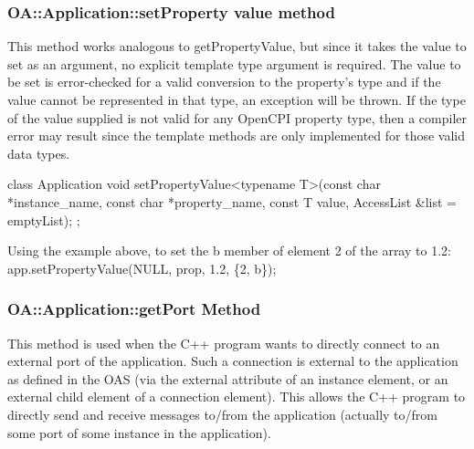 \documentclass[10pt, a4paper, oneside]{article}
\renewcommand\_{\textunderscore\allowbreak} %
\begin{document}
\subsubsection{OA::Application::setProperty value method}
This method works analogous to getPropertyValue, but since it takes the value to set as an argument, no explicit template type argument is required. The value to be set is error-checked for a valid conversion to the property's type and if the value cannot be represented in that type, an exception will be thrown. If the type of the value supplied is not valid for any OpenCPI property type, then a compiler error may result since the template methods are only implemented for those valid data types.
\begin{ocpixml}
class Application {
void setPropertyValue<typename T>(const char *instance_name,
                                      const char *property_name,
                                      const T value,
                                      AccessList &list = emptyList);
};\end{ocpixml} 
Using the example above, to set the b member of element 2 of the array to 1.2: app.setPropertyValue(NULL, prop, 1.2, \{2, b\});
\subsubsection{OA::Application::getPort Method}
This method is used when the C++ program wants to directly connect to an external port of the application.  Such a connection is external to the application as defined in the OAS (via the external attribute of an instance element, or an external child element of a connection element). This allows the C++ program to directly send and receive messages to/from the application (actually to/from some port of some instance in the application). \\
\end{document}
